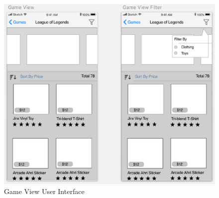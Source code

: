 \documentclass[onecolumn, draftclsnofoot,10pt, compsoc]{IEEEtran}
\begin{document}
\begin{figure}[H]
\centering
\captionsetup{justification=centering}
\includegraphics[scale=.50]{GameView}
\caption{Game View User Interface}
\captionsetup{justification=centering}
\end{figure}

\newpage


\end{document}
